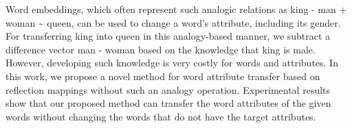 Word embeddings, which often represent such analogic relations as king - man + woman {\textasciitilde} queen, can be used to change a word's attribute, including its gender. For transferring king into queen in this analogy-based manner, we subtract a difference vector man - woman based on the knowledge that king is male. However, developing such knowledge is very costly for words and attributes. In this work, we propose a novel method for word attribute transfer based on reflection mappings without such an analogy operation. Experimental results show that our proposed method can transfer the word attributes of the given words without changing the words that do not have the target attributes.
